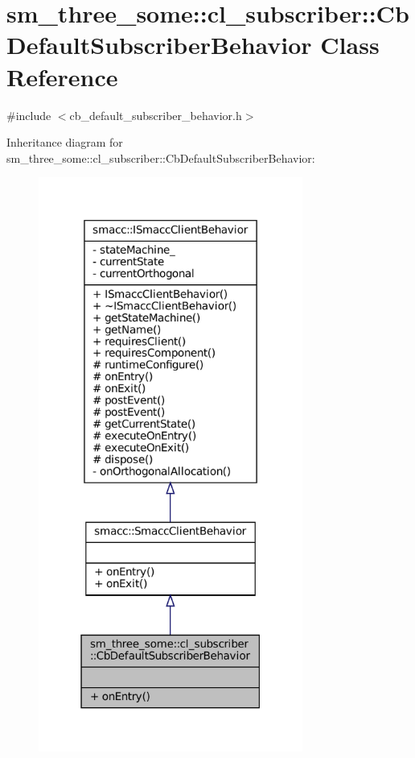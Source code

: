 \hypertarget{classsm__three__some_1_1cl__subscriber_1_1CbDefaultSubscriberBehavior}{}\section{sm\+\_\+three\+\_\+some\+:\+:cl\+\_\+subscriber\+:\+:Cb\+Default\+Subscriber\+Behavior Class Reference}
\label{classsm__three__some_1_1cl__subscriber_1_1CbDefaultSubscriberBehavior}


{\ttfamily \#include $<$cb\+\_\+default\+\_\+subscriber\+\_\+behavior.\+h$>$}



Inheritance diagram for sm\+\_\+three\+\_\+some\+:\+:cl\+\_\+subscriber\+:\+:Cb\+Default\+Subscriber\+Behavior\+:
\nopagebreak
\begin{figure}[H]
\begin{center}
\leavevmode
\includegraphics[width=246pt]{classsm__three__some_1_1cl__subscriber_1_1CbDefaultSubscriberBehavior__inherit__graph}
\end{center}
\end{figure}


